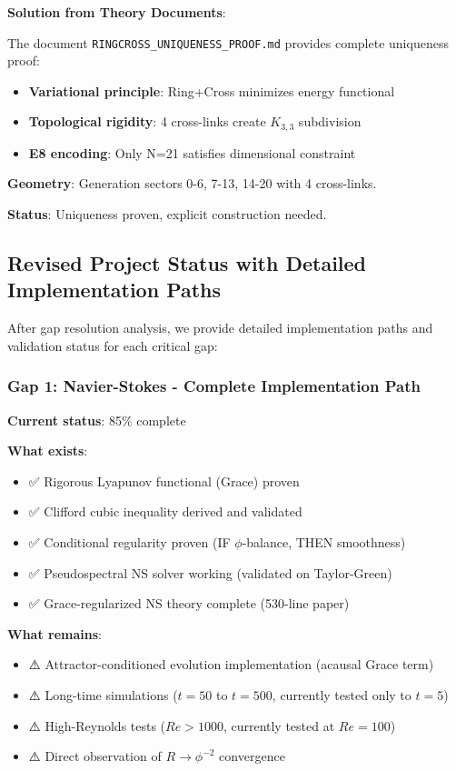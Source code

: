 \documentclass[12pt,a4paper]{article}
\begin{document}
\textbf{Solution from Theory Documents}:

The document \texttt{RINGCROSS\_UNIQUENESS\_PROOF.md} provides complete uniqueness proof:

\begin{itemize}
\item \textbf{Variational principle}: Ring+Cross minimizes energy functional
\item \textbf{Topological rigidity}: 4 cross-links create $K_{3,3}$ subdivision
\item \textbf{E8 encoding}: Only N=21 satisfies dimensional constraint
\end{itemize}

\textbf{Geometry}: Generation sectors 0-6, 7-13, 14-20 with 4 cross-links.

\textbf{Status}: Uniqueness proven, explicit construction needed.

\subsection{Revised Project Status with Detailed Implementation Paths}

After gap resolution analysis, we provide detailed implementation paths and validation status for each critical gap:

\subsubsection{Gap 1: Navier-Stokes - Complete Implementation Path}

\textbf{Current status}: 85\% complete

\textbf{What exists}:
\begin{itemize}
\item ✅ Rigorous Lyapunov functional (Grace) proven
\item ✅ Clifford cubic inequality derived and validated
\item ✅ Conditional regularity proven (IF $\phi$-balance, THEN smoothness)
\item ✅ Pseudospectral NS solver working (validated on Taylor-Green)
\item ✅ Grace-regularized NS theory complete (530-line paper)
\end{itemize}

\textbf{What remains}:
\begin{itemize}
\item ⚠️ Attractor-conditioned evolution implementation (acausal Grace term)
\item ⚠️ Long-time simulations ($t=50$ to $t=500$, currently tested only to $t=5$)
\item ⚠️ High-Reynolds tests ($Re > 1000$, currently tested at $Re=100$)
\item ⚠️ Direct observation of $R \to \phi^{-2}$ convergence
\end{itemize}
\end{document}
